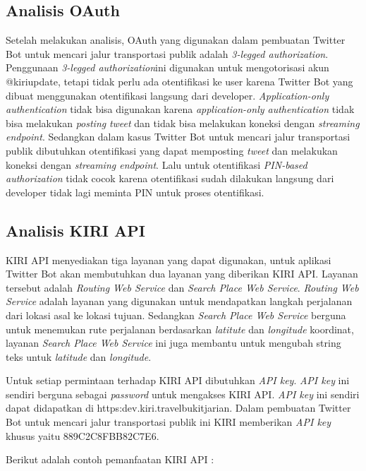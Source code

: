 \subsection{Analisis OAuth}
Setelah melakukan analisis, OAuth yang digunakan dalam pembuatan Twitter Bot untuk mencari jalur transportasi publik adalah \textit{3-legged authorization}. Penggunaan \textit{3-legged authorization}ini digunakan untuk mengotorisasi akun @kiriupdate, tetapi tidak perlu ada otentifikasi ke user karena Twitter Bot yang dibuat menggunakan otentifikasi langsung dari developer. \textit{Application-only authentication} tidak bisa digunakan karena \textit{application-only authentication} tidak bisa melakukan \textit{posting} \textit{tweet} dan tidak bisa melakukan koneksi dengan \textit{streaming endpoint}. Sedangkan dalam kasus Twitter Bot untuk mencari jalur transportasi publik dibutuhkan otentifikasi yang dapat memposting \textit{tweet} dan melakukan koneksi dengan \textit{streaming endpoint}. Lalu untuk otentifikasi \textit{PIN-based authorization} tidak cocok karena otentifikasi sudah dilakukan langsung dari developer tidak lagi meminta PIN untuk proses otentifikasi.

\subsection{Analisis KIRI API}
KIRI API menyediakan tiga layanan yang dapat digunakan, untuk aplikasi Twitter Bot akan membutuhkan dua layanan yang diberikan KIRI API. Layanan tersebut adalah \textit{Routing Web Service} dan \textit{Search Place Web Service}. \textit{Routing Web Service} adalah layanan yang digunakan untuk mendapatkan langkah perjalanan dari lokasi asal ke lokasi tujuan. Sedangkan \textit{Search Place Web Service} berguna untuk menemukan rute perjalanan berdasarkan \textit{latitute} dan \textit{longitude} koordinat,  layanan \textit{Search Place Web Service} ini juga membantu untuk mengubah string teks untuk \textit{latitude} dan \textit{longitude}.

Untuk setiap permintaan terhadap KIRI API dibutuhkan \textit{API key}. \textit{API key} ini sendiri berguna sebagai \textit{password} untuk mengakses KIRI API. \textit{API key} ini sendiri dapat didapatkan di https:\/\/dev.kiri.travel\/bukitjarian\/. Dalam pembuatan Twitter Bot untuk mencari jalur transportasi publik ini KIRI memberikan \textit{API key} khusus yaitu 889C2C8FBB82C7E6.

Berikut adalah contoh pemanfaatan KIRI API :

